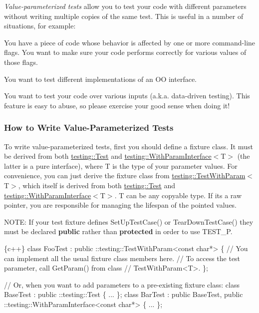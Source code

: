 {\itshape Value-\/parameterized tests} allow you to test your code with different parameters without writing multiple copies of the same test. This is useful in a number of situations, for example\+:


\begin{DoxyItemize}
\item You have a piece of code whose behavior is affected by one or more command-\/line flags. You want to make sure your code performs correctly for various values of those flags.
\item You want to test different implementations of an OO interface.
\item You want to test your code over various inputs (a.\+k.\+a. data-\/driven testing). This feature is easy to abuse, so please exercise your good sense when doing it!
\end{DoxyItemize}

\subsubsection*{How to Write Value-\/\+Parameterized Tests}

To write value-\/parameterized tests, first you should define a fixture class. It must be derived from both {\ttfamily \mbox{\hyperlink{classtesting_1_1_test}{testing\+::\+Test}}} and {\ttfamily \mbox{\hyperlink{classtesting_1_1_with_param_interface}{testing\+::\+With\+Param\+Interface}}$<$T$>$} (the latter is a pure interface), where {\ttfamily T} is the type of your parameter values. For convenience, you can just derive the fixture class from {\ttfamily \mbox{\hyperlink{classtesting_1_1_test_with_param}{testing\+::\+Test\+With\+Param}}$<$T$>$}, which itself is derived from both {\ttfamily \mbox{\hyperlink{classtesting_1_1_test}{testing\+::\+Test}}} and {\ttfamily \mbox{\hyperlink{classtesting_1_1_with_param_interface}{testing\+::\+With\+Param\+Interface}}$<$T$>$}. {\ttfamily T} can be any copyable type. If it\textquotesingle{}s a raw pointer, you are responsible for managing the lifespan of the pointed values.

N\+O\+TE\+: If your test fixture defines {\ttfamily Set\+Up\+Test\+Case()} or {\ttfamily Tear\+Down\+Test\+Case()} they must be declared {\bfseries public} rather than {\bfseries protected} in order to use {\ttfamily T\+E\+S\+T\+\_\+P}.


\begin{DoxyCode}
\{c++\}
class FooTest :
    public ::testing::TestWithParam<const char*> \{
  // You can implement all the usual fixture class members here.
  // To access the test parameter, call GetParam() from class
  // TestWithParam<T>.
\};

// Or, when you want to add parameters to a pre-existing fixture class:
class BaseTest : public ::testing::Test \{
  ...
\};
class BarTest : public BaseTest,
                public ::testing::WithParamInterface<const char*> \{
  ...
\};
\end{DoxyCode}


